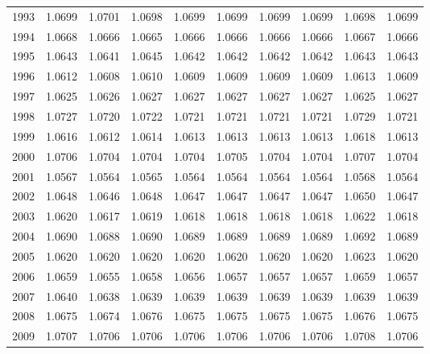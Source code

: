 \begin{tabular}{cccccccccc}
  1993 & 1.0699 & 1.0701 & 1.0698 & 1.0699 & 1.0699 & 1.0699 & 1.0699 & 1.0698 & 1.0699 \\ 
  1994 & 1.0668 & 1.0666 & 1.0665 & 1.0666 & 1.0666 & 1.0666 & 1.0666 & 1.0667 & 1.0666 \\ 
  1995 & 1.0643 & 1.0641 & 1.0645 & 1.0642 & 1.0642 & 1.0642 & 1.0642 & 1.0643 & 1.0643 \\ 
  1996 & 1.0612 & 1.0608 & 1.0610 & 1.0609 & 1.0609 & 1.0609 & 1.0609 & 1.0613 & 1.0609 \\ 
  1997 & 1.0625 & 1.0626 & 1.0627 & 1.0627 & 1.0627 & 1.0627 & 1.0627 & 1.0625 & 1.0627 \\ 
  1998 & 1.0727 & 1.0720 & 1.0722 & 1.0721 & 1.0721 & 1.0721 & 1.0721 & 1.0729 & 1.0721 \\ 
  1999 & 1.0616 & 1.0612 & 1.0614 & 1.0613 & 1.0613 & 1.0613 & 1.0613 & 1.0618 & 1.0613 \\ 
  2000 & 1.0706 & 1.0704 & 1.0704 & 1.0704 & 1.0705 & 1.0704 & 1.0704 & 1.0707 & 1.0704 \\ 
  2001 & 1.0567 & 1.0564 & 1.0565 & 1.0564 & 1.0564 & 1.0564 & 1.0564 & 1.0568 & 1.0564 \\ 
  2002 & 1.0648 & 1.0646 & 1.0648 & 1.0647 & 1.0647 & 1.0647 & 1.0647 & 1.0650 & 1.0647 \\ 
  2003 & 1.0620 & 1.0617 & 1.0619 & 1.0618 & 1.0618 & 1.0618 & 1.0618 & 1.0622 & 1.0618 \\ 
  2004 & 1.0690 & 1.0688 & 1.0690 & 1.0689 & 1.0689 & 1.0689 & 1.0689 & 1.0692 & 1.0689 \\ 
  2005 & 1.0620 & 1.0620 & 1.0620 & 1.0620 & 1.0620 & 1.0620 & 1.0620 & 1.0623 & 1.0620 \\ 
  2006 & 1.0659 & 1.0655 & 1.0658 & 1.0656 & 1.0657 & 1.0657 & 1.0657 & 1.0659 & 1.0657 \\ 
  2007 & 1.0640 & 1.0638 & 1.0639 & 1.0639 & 1.0639 & 1.0639 & 1.0639 & 1.0639 & 1.0639 \\ 
  2008 & 1.0675 & 1.0674 & 1.0676 & 1.0675 & 1.0675 & 1.0675 & 1.0675 & 1.0676 & 1.0675 \\ 
  2009 & 1.0707 & 1.0706 & 1.0706 & 1.0706 & 1.0706 & 1.0706 & 1.0706 & 1.0708 & 1.0706 \\ 
   \hline
\end{tabular}
